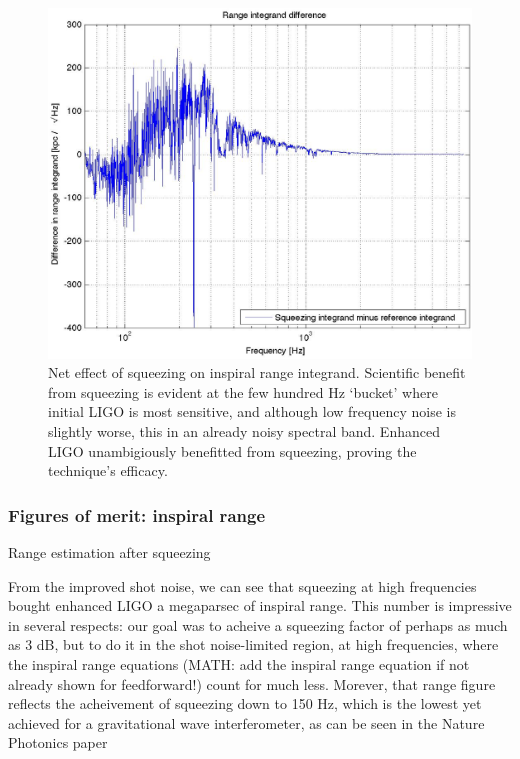 \begin{figure}
\begin{center}
\includegraphics[height=0.5\paperheight, width=0.5\paperwidth,keepaspectratio]{range_integrand_difference.eps}
\caption{Net effect of squeezing on inspiral range integrand. Scientific benefit from squeezing is evident at the few hundred Hz `bucket' where initial LIGO is most sensitive, and although low frequency noise is slightly worse, this in an already noisy spectral band. Enhanced LIGO unambigiously benefitted from squeezing, proving the technique's efficacy.
}
\label{squeezing_range_net}
\end{center}
\end{figure}




            \subsubsection{Figures of merit: inspiral range}
            \label{range_est}


                Range estimation after squeezing

		From the improved shot noise, we can see that squeezing at high frequencies bought enhanced LIGO a megaparsec of inspiral range. This number is impressive in several respects: our goal was to acheive a squeezing factor of perhaps as much as 3 dB, but to do it in the shot noise-limited region, at high frequencies, where the inspiral range equations (MATH: add the inspiral range equation if not already shown for feedforward!) count for much less. Morever, that range figure reflects the acheivement of squeezing down to 150 Hz, which is the lowest yet achieved for a gravitational wave interferometer, as can be seen in the Nature Photonics paper~\cite{BarsottiNatureSqueezing}


